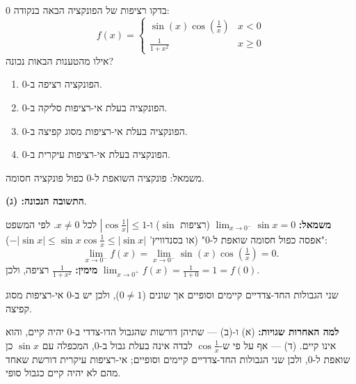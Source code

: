 
\begin{question}
בדקו רציפות של הפונקציה הבאה בנקודה 0:
\[
f(x)=\begin{cases}
\sin(x)\cos(\frac{1}{x}) & x<0\\
\frac{1}{1+x^2} & x\ge 0
\end{cases}
\]
אילו מהטענות הבאות נכונה?
\begin{enumerate}
  \item הפונקציה רציפה ב-0.
  \item הפונקציה בעלת אי-רציפות סליקה ב-0.
  \item הפונקציה בעלת אי-רציפות מסוג קפיצה ב-0.
  \item הפונקציה בעלת אי-רציפות עיקרית ב-0.
\end{enumerate}
\end{question}

\begin{hint}
משמאל: פונקציה השואפת ל-0 כפול פונקציה חסומה.
\end{hint}

\begin{solution}
\textbf{התשובה הנכונה: (ג)}.

\textbf{משמאל:} $\lim_{x\to0^-}\sin x=0$ (רציפות $\sin$) ו-$\left|\cos\frac1x\right|\le1$ לכל $x\neq0$. לפי המשפט "אפסה כפול חסומה שואפת ל-0" (או בסנדוויץ' $-|\sin x|\le\sin x\cos\frac1x\le|\sin x|$):
\[
\lim_{x\to0^-}f(x)=\lim_{x\to0^-}\sin(x)\cos\left(\tfrac1x\right)=0 .
\]
\textbf{מימין:} $\frac{1}{1+x^2}$ רציפה, ולכן $\lim_{x\to0^+}f(x)=\frac{1}{1+0}=1=f(0)$.

שני הגבולות החד-צדדיים קיימים וסופיים אך שונים ($0\neq1$), ולכן יש ב-0 אי-רציפות מסוג קפיצה.

\textbf{למה האחרות שגויות:} (א) ו-(ב) — שתיהן דורשות שהגבול הדו-צדדי ב-0 יהיה קיים, והוא אינו קיים. (ד) — אף על פי ש-$\cos\frac1x$ לבדה אינה בעלת גבול ב-0, המכפלה עם $\sin x$ כן שואפת ל-0, ולכן שני הגבולות החד-צדדיים קיימים וסופיים; אי-רציפות עיקרית דורשת שאחד מהם לא יהיה קיים כגבול סופי.
\end{solution}
